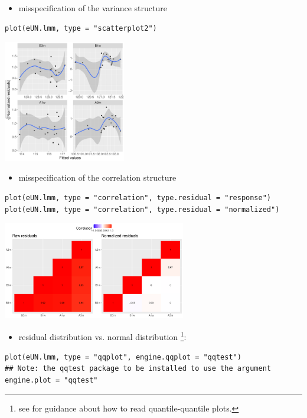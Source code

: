 \documentclass[12pt]{article}
\begin{document}
\begin{itemize}
\item misspecification of the variance structure
\end{itemize}
\lstset{language=r,label= ,caption= ,captionpos=b,numbers=none}
\begin{lstlisting}
plot(eUN.lmm, type = "scatterplot2")
\end{lstlisting}

\begin{center}
\includegraphics[width=0.4\textwidth]{./figures/diag-scatterplot2.pdf}
\end{center}

\begin{itemize}
\item misspecification of the correlation structure
\end{itemize}

\lstset{language=r,label= ,caption= ,captionpos=b,numbers=none}
\begin{lstlisting}
plot(eUN.lmm, type = "correlation", type.residual = "response")
plot(eUN.lmm, type = "correlation", type.residual = "normalized")
\end{lstlisting}

\begin{center}
\includegraphics[width=0.6\textwidth]{./figures/diag-correlation.pdf}
\end{center}

\begin{itemize}
\item residual distribution vs. normal distribution \footnote{see \cite{oldford2016self} for guidance
about how to read quantile-quantile plots.}:
\end{itemize}
\lstset{language=r,label= ,caption= ,captionpos=b,numbers=none}
\begin{lstlisting}
plot(eUN.lmm, type = "qqplot", engine.qqplot = "qqtest")
## Note: the qqtest package to be installed to use the argument engine.plot = "qqtest" 
\end{lstlisting}
\end{document}

